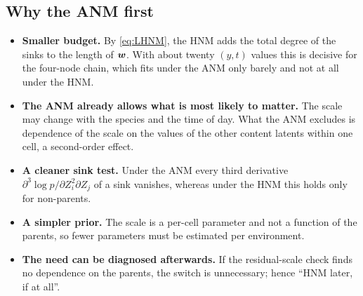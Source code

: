 \subsection{Why the ANM first}
\begin{itemize}[leftmargin=1.5em]
\item \textbf{Smaller budget.} By \cref{eq:LHNM}, the HNM adds the total degree of the sinks to the length of
      $\boldsymbol{w}$. With about twenty $(y,t)$ values this is decisive for the four-node chain, which fits
      under the ANM only barely and not at all under the HNM.
\item \textbf{The ANM already allows what is most likely to matter.} The scale may change with the species and
      the time of day. What the ANM excludes is dependence of the scale on the values of the other content
      latents within one cell, a second-order effect.
\item \textbf{A cleaner sink test.} Under the ANM every third derivative $\partial^3\log p/\partial Z_i^2\partial Z_j$
      of a sink vanishes, whereas under the HNM this holds only for non-parents.
\item \textbf{A simpler prior.} The scale is a per-cell parameter and not a function of the parents, so fewer
      parameters must be estimated per environment.
\item \textbf{The need can be diagnosed afterwards.} If the residual-scale check finds no dependence on the
      parents, the switch is unnecessary; hence ``HNM later, if at all''.
\end{itemize}
